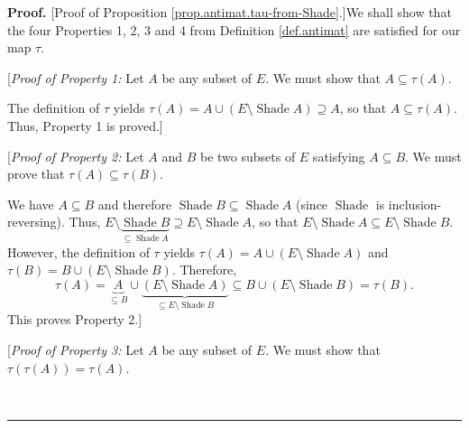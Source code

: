 \documentclass[numbers=enddot,12pt,final,onecolumn]{scrartcl}%
\theoremstyle{definition}
\newenvironment{proof}[1][Proof]{\noindent\textbf{#1.} }{\ \rule{0.5em}{0.5em}}
\newenvironment{verlong}{}{}
\begin{document}
\begin{verlong}


\begin{proof}
[Proof of Proposition \ref{prop.antimat.tau-from-Shade}.]We shall show that
the four Properties 1, 2, 3 and 4 from Definition \ref{def.antimat} are
satisfied for our map $\tau$.

[\textit{Proof of Property 1:} Let $A$ be any subset of $E$. We must show that
$A\subseteq\tau\left(  A\right)  $.

The definition of $\tau$ yields $\tau\left(  A\right)  =A\cup\left(
E\setminus\operatorname*{Shade}A\right)  \supseteq A$, so that $A\subseteq
\tau\left(  A\right)  $. Thus, Property 1 is proved.]

[\textit{Proof of Property 2:} Let $A$ and $B$ be two subsets of $E$
satisfying $A\subseteq B$. We must prove that $\tau\left(  A\right)
\subseteq\tau\left(  B\right)  $.

We have $A\subseteq B$ and therefore $\operatorname*{Shade}B\subseteq
\operatorname*{Shade}A$ (since $\operatorname*{Shade}$ is
inclusion-reversing). Thus, $E\setminus\underbrace{\operatorname*{Shade}%
B}_{\subseteq\operatorname*{Shade}A}\supseteq E\setminus\operatorname*{Shade}%
A$, so that $E\setminus\operatorname*{Shade}A\subseteq E\setminus
\operatorname*{Shade}B$. However, the definition of $\tau$ yields $\tau\left(
A\right)  =A\cup\left(  E\setminus\operatorname*{Shade}A\right)  $ and
$\tau\left(  B\right)  =B\cup\left(  E\setminus\operatorname*{Shade}B\right)
$. Therefore,%
\[
\tau\left(  A\right)  =\underbrace{A}_{\subseteq B}\cup\underbrace{\left(
E\setminus\operatorname*{Shade}A\right)  }_{\subseteq E\setminus
\operatorname*{Shade}B}\subseteq B\cup\left(  E\setminus\operatorname*{Shade}%
B\right)  =\tau\left(  B\right)  .
\]
This proves Property 2.]

[\textit{Proof of Property 3:} Let $A$ be any subset of $E$. We must show that
$\tau\left(  \tau\left(  A\right)  \right)  =\tau\left(  A\right)  $.


\end{proof}
\end{verlong}
\end{document}
